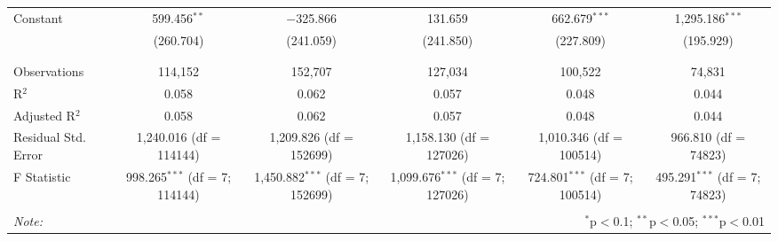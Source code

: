 \begin{table}[!htbp]
\begin{tabular}{@{\extracolsep{5pt}}lccccc}
 Constant & 599.456$^{**}$ & $-$325.866 & 131.659 & 662.679$^{***}$ & 1,295.186$^{***}$ \\ 
  & (260.704) & (241.059) & (241.850) & (227.809) & (195.929) \\ 
  & & & & & \\ 
\hline \\[-1.8ex] 
Observations & 114,152 & 152,707 & 127,034 & 100,522 & 74,831 \\ 
R$^{2}$ & 0.058 & 0.062 & 0.057 & 0.048 & 0.044 \\ 
Adjusted R$^{2}$ & 0.058 & 0.062 & 0.057 & 0.048 & 0.044 \\ 
Residual Std. Error & 1,240.016 (df = 114144) & 1,209.826 (df = 152699) & 1,158.130 (df = 127026) & 1,010.346 (df = 100514) & 966.810 (df = 74823) \\ 
F Statistic & 998.265$^{***}$ (df = 7; 114144) & 1,450.882$^{***}$ (df = 7; 152699) & 1,099.676$^{***}$ (df = 7; 127026) & 724.801$^{***}$ (df = 7; 100514) & 495.291$^{***}$ (df = 7; 74823) \\ 
\hline 
\hline \\[-1.8ex] 
\textit{Note:}  & \multicolumn{5}{r}{$^{*}$p$<$0.1; $^{**}$p$<$0.05; $^{***}$p$<$0.01} \\ 
\end{tabular} 
\end{table} 
